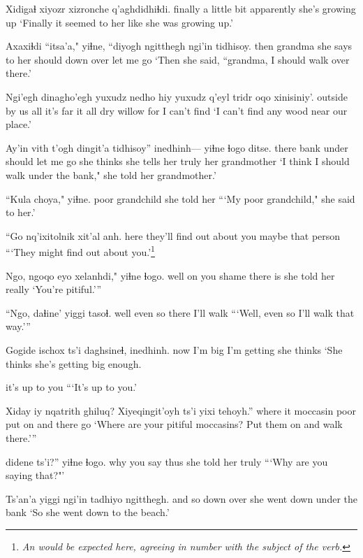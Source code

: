 \documentclass[12pt]{article}
\begin{document}
\gll Xidigaɬ xiyozr xizronche  q'aghdidhiɬdi.
finally {a little bit} apparently {she's growing up}
\glt `Finally it seemed to her like she was growing up.'
\glend

\gll Axaxiɬdi ``itsa'a," yiɬne,         ``diyogh ngitthegh ngi'in tidhisoy.
then     grandma   {she says to her} should  down      over   {let me go}
\glt `Then she said, ``grandma, I should walk over there.'
\glend

\gll Ngi'egh dinagho'egh yuxudz nedho    hiy yuxudz {q'eyl tridr} oqo xinisiniy'.
outside {by us}     all    {it's far} it  all   {dry willow} for  {I can't find}
\glt `I can't find any wood near our place.'
\glend

\gll Ay'in vith t'ogh dingit'a tidhisoy''  inedhinh--- yiɬne         ɬogo  ditse.
there bank under should   {let me go} {she thinks} {she tells her} truly {her grandmother}
\glt `I think I should walk under the bank," she told her grandmother.'
\glend

\gll ``Kula choya,"   yiɬne.
poor grandchild {she told her}
\glt ```My poor grandchild," she said to her.'
\glend

\gll ``Go   nq'ixitolnik       xit'al anh.
 here {they'll find out about you} maybe  {that person}
\glt ```They might find out about you.'\footnote{\em An \em would be expected here, agreeing in number with the subject of the verb.}
\glend

\gll Ngo, ngoqo  eyo   xelanhdi," yiɬne        ɬogo.
well {on you} shame {there is}     {she told her} really
\glt `You're pitiful.'''
\glend

\gll ``Ngo, daɬine' yiggi tasoɬ.
 well {even so} there {I'll walk}
\glt ```Well, even so I'll walk that way.'''
\glend

\gll Gogide ischox ts'i daghsineɬ,   inedhinh.
now    {I'm big} {}  {I'm getting} {she thinks}
\glt `She thinks she's getting big enough.
\glend

{{it's up to you}}
\glt ```It's up to you.'
\glend

\gll Xiday iy nqatrith ghiluq? Xiyeqingit'oyh ts'i yixi tehoyh.''
where it moccasin    poor   {put on}        and  there go
\glt `Where are your pitiful moccasins? Put them on and walk there.'''
\glend

 didene ts'i?''  yiɬne ɬogo.
why         {you say thus} {} {she told her} truly 
\glt ```Why are you saying that?"'
\glend

\gll Ts'an'a yiggi ngi'in tadhiyo  ngitthegh. 
{and so}   down over {she went} {down under the bank}
\glt `So she went down to the beach.'
\glend
\end{document}
